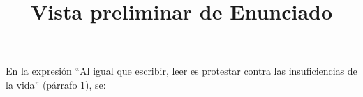 \documentclass[a4paper,12pt]{article}\usepackage[utf8]{inputenc}\usepackage[spanish]{babel}\usepackage{times}
\title{Vista preliminar de Enunciado}
\begin{document}
\twocolumn 

\maketitle

En la expresión “Al igual que escribir, leer es protestar contra las insuficiencias de la vida” (párrafo 1), se:
\end{document}
